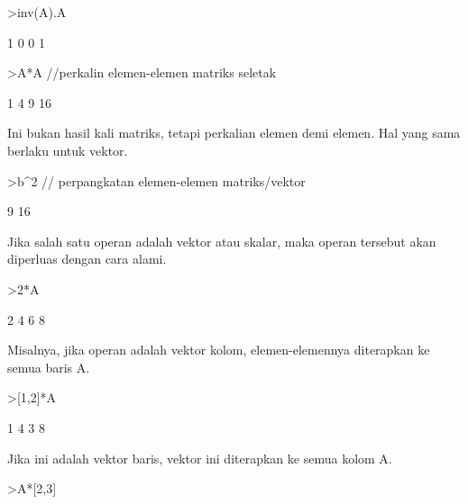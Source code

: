 \documentclass[a4paper,10pt]{article}
\begin{document}
\begin{eulernotebook}
\begin{eulercomment}
\begin{eulercomment}
\begin{eulercomment}
\begin{eulercomment}
\begin{eulerprompt}
>inv(A).A
\end{eulerprompt}
\begin{euleroutput}
              1             0 
              0             1 
\end{euleroutput}
\begin{eulerprompt}
>A*A //perkalin elemen-elemen matriks seletak
\end{eulerprompt}
\begin{euleroutput}
              1             4 
              9            16 
\end{euleroutput}
\begin{eulercomment}
Ini bukan hasil kali matriks, tetapi perkalian elemen demi elemen. Hal
yang sama berlaku untuk vektor.
\end{eulercomment}
\begin{eulerprompt}
>b^2 // perpangkatan elemen-elemen matriks/vektor
\end{eulerprompt}
\begin{euleroutput}
              9 
             16 
\end{euleroutput}
\begin{eulercomment}
Jika salah satu operan adalah vektor atau skalar, maka operan tersebut
akan diperluas dengan cara alami.
\end{eulercomment}
\begin{eulerprompt}
>2*A
\end{eulerprompt}
\begin{euleroutput}
              2             4 
              6             8 
\end{euleroutput}
\begin{eulercomment}
Misalnya, jika operan adalah vektor kolom, elemen-elemennya diterapkan
ke semua baris A.
\end{eulercomment}
\begin{eulerprompt}
>[1,2]*A
\end{eulerprompt}
\begin{euleroutput}
              1             4 
              3             8 
\end{euleroutput}
\begin{eulercomment}
Jika ini adalah vektor baris, vektor ini diterapkan ke semua kolom A.
\end{eulercomment}
\begin{eulerprompt}
>A*[2,3]
\end{eulerprompt}
\begin{euleroutput}

\end{euleroutput}
\end{eulercomment}
\end{eulercomment}
\end{eulercomment}
\end{eulercomment}
\end{eulernotebook}
\end{document}
